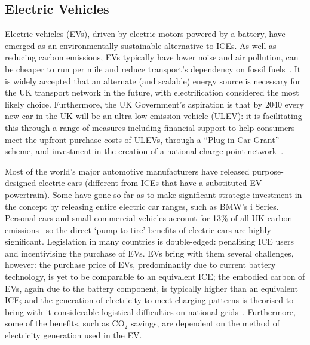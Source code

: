 \documentclass[b5paper,10pt]{article}
\begin{document}
\subsection{Electric Vehicles}

Electric vehicles (EVs), driven by electric motors powered by a
battery, have emerged as an environmentally sustainable alternative to
ICEs. As well as reducing carbon emissions, EVs typically have lower
noise and air pollution, can be cheaper to run per mile and reduce
transport's dependency on fossil fuels~\citep{postevs:2010}. It is
widely accepted that an alternate (and scalable) energy source is
necessary for the UK transport network in the future, with
electrification considered the most likely choice. Furthermore, the UK
Government's aspiration is that by 2040 every new car in the UK will
be an ultra-low emission vehicle (ULEV): it is facilitating this
through a range of measures including financial support to help
consumers meet the upfront purchase costs of ULEVs, through a
``Plug-in Car Grant'' scheme, and investment in the creation of a
national charge point network~\citep{brook:2015}.

Most of the world's major automotive manufacturers have released
purpose-designed electric cars (different from ICEs that have a
substituted EV powertrain). Some have gone so far as to make
significant strategic investment in the concept by releasing entire
electric car ranges, such as BMW's i Series. Personal cars and small
commercial vehicles account for 13\% of all UK carbon
emissions~\citep{lumsden:2012} so the direct `pump-to-tire' benefits
of electric cars are highly significant. Legislation in many countries
is double-edged: penalising ICE users and incentivising the
purchase of EVs. EVs bring with them several challenges, however: the
purchase price of EVs, predominantly due to current battery
technology, is yet to be comparable to an equivalent ICE; the embodied
carbon of EVs, again due to the battery component, is typically higher
than an equivalent ICE; and the generation of electricity to meet
charging patterns is theorised to bring with it considerable
logistical difficulties on national
grids~\citep{su-et-al:2011,akhavan-rezai-et-al:2015}. Furthermore,
some of the benefits, such as CO$_2$ savings, are dependent on the
method of electricity generation used in the EV.
\end{document}
